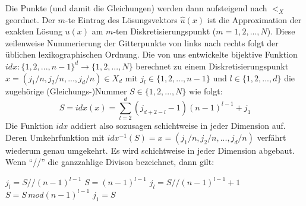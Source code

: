 \documentclass{scrartcl}
\begin{document}
Die Punkte (und damit die Gleichungen) werden dann aufsteigend nach $<_X$ geordnet. Der $m$-te Eintrag des Lösungsvektors $\hat{u}(x)$ ist die Approximation der exakten Lösung $u(x)$ am $m$-ten Diskretisierungspunkt ($m = 1, 2, ..., N$). Diese zeilenweise Nummerierung der Gitterpunkte von links nach rechts folgt der üblichen lexikographischen Ordnung.
Die von uns entwickelte bijektive Funktion $idx: \lbrace1, 2, ..., n-1\rbrace^d \to \lbrace1, 2, ..., N\rbrace$ berechnet zu einem Diskretisierungspunkt $x = (j_1/n, j_2/n, ..., j_d/n) \in X_d$ mit $j_l \in \lbrace1, 2, ..., n-1\rbrace$ und $l \in \lbrace1, 2, ..., d\rbrace$ die zugehörige (Gleichungs-)Nummer $S \in \lbrace1, 2, ..., N\rbrace$ wie folgt:
\[S=idx(x) = \sum_{l=2}^{d} (j_{d+2-l}-1)(n-1)^{l-1}+j_1 \]
Die Funktion $idx$ addiert also sozusagen schichtweise in jeder Dimension auf.
Deren Umkehrfunktion mit $idx^{-1}(S) = x = (j_1/n, j_2/n, ..., j_d/n)$ verfährt wiederum genau umgekehrt. Es wird schichtweise in jeder Dimension abgebaut. Wenn "`//"' die ganzzahlige Divison bezeichnet, dann gilt:

\begin{algorithmic}
      \State $j_l=S//(n-1)^{l-1}$
      \State $S = (n-1)^{l-1}$
    \Else
      \State $j_l=S//(n-1)^{l-1} + 1$
      \State $S = S \, mod(n-1)^{l-1}$
    \EndIf
  \EndFor
  \State $j_1 = S$
\end{algorithmic}

%
%
%
\end{document}
